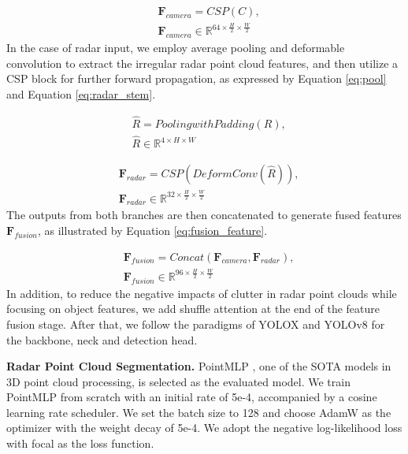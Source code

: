 \documentclass[lettersize,journal]{IEEEtran}
\begin{document}
\begin{equation}
    \begin{aligned}
  &  \mathbf{F}_{camera} = CSP(C), \\
  &  \mathbf{F}_{camera} \in \mathbb{R}^{64 \times \frac{H}{2} \times \frac{W}{2}}
    \label{eq:csp}
\end{aligned}
\end{equation}
In the case of radar input, we employ average pooling and deformable convolution \cite{zhu2020deformable} to extract the irregular radar point cloud features, and then utilize a CSP block for further forward propagation, as expressed by Equation \ref{eq:pool} and Equation \ref{eq:radar_stem}. 

\begin{equation}
\begin{aligned}
  &  \hat{R} = PoolingwithPadding(R), \\
  &  \hat{R} \in \mathbb{R}^{4 \times H \times W}
    \label{eq:pool}
\end{aligned}
\end{equation}

\begin{equation}
\begin{aligned}
  &  \mathbf{F}_{radar} = CSP(DeformConv(\hat{R})), \\
  &  \mathbf{F}_{radar} \in \mathbb{R}^{32 \times \frac{H}{2} \times \frac{W}{2}}
    \label{eq:radar_stem}
\end{aligned}
\end{equation}
The outputs from both branches are then concatenated to generate fused features $\mathbf{F}_{fusion}$, as illustrated by Equation \ref{eq:fusion_feature}. 

\begin{equation}
\begin{aligned}
  &  \mathbf{F}_{fusion} = Concat(\mathbf{F}_{camera}, \mathbf{F}_{radar}),   \\
  &  \mathbf{F}_{fusion} \in \mathbb{R}^{96 \times \frac{H}{2} \times \frac{W}{2}}
    \label{eq:fusion_feature}
\end{aligned}
\end{equation}
In addition, to reduce the negative impacts of clutter in radar point clouds while focusing on object features, we add shuffle attention \cite{zhang2021sa} at the end of the feature fusion stage. After that, we follow the paradigms of YOLOX and YOLOv8 for the backbone, neck and detection head.

\textbf{Radar Point Cloud Segmentation.} PointMLP \cite{ma2022rethinking}, one of the SOTA models in 3D point cloud processing, is selected as the evaluated model. We train PointMLP from scratch with an initial rate of 5e-4, accompanied by a cosine learning rate scheduler. We set the batch size to 128 and choose AdamW as the optimizer with the weight decay of 5e-4. We adopt the negative log-likelihood loss with focal \cite{lin2017focal} as the loss function. 
\end{document}
